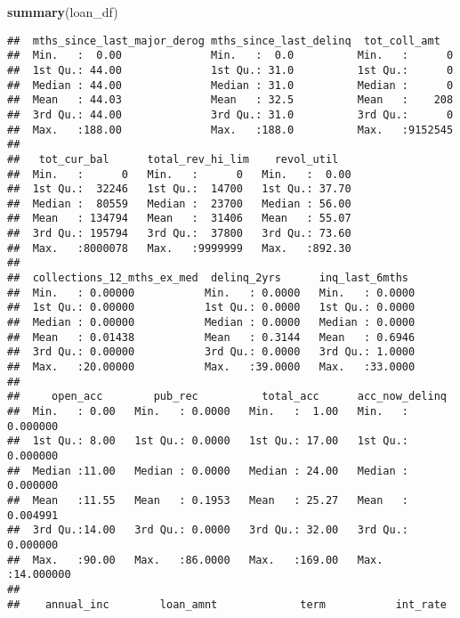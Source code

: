 \documentclass[]{article}
\newenvironment{Shaded}{\begin{snugshade}}{\end{snugshade}}
\newcommand{\KeywordTok}[1]{\textcolor[rgb]{0.13,0.29,0.53}{\textbf{#1}}}
\newcommand{\NormalTok}[1]{#1}
\begin{document}
\begin{Shaded}
\begin{Highlighting}[]
\KeywordTok{summary}\NormalTok{(loan_df)}
\end{Highlighting}
\end{Shaded}

\begin{verbatim}
##  mths_since_last_major_derog mths_since_last_delinq  tot_coll_amt    
##  Min.   :  0.00              Min.   :  0.0          Min.   :      0  
##  1st Qu.: 44.00              1st Qu.: 31.0          1st Qu.:      0  
##  Median : 44.00              Median : 31.0          Median :      0  
##  Mean   : 44.03              Mean   : 32.5          Mean   :    208  
##  3rd Qu.: 44.00              3rd Qu.: 31.0          3rd Qu.:      0  
##  Max.   :188.00              Max.   :188.0          Max.   :9152545  
##                                                                      
##   tot_cur_bal      total_rev_hi_lim    revol_util    
##  Min.   :      0   Min.   :      0   Min.   :  0.00  
##  1st Qu.:  32246   1st Qu.:  14700   1st Qu.: 37.70  
##  Median :  80559   Median :  23700   Median : 56.00  
##  Mean   : 134794   Mean   :  31406   Mean   : 55.07  
##  3rd Qu.: 195794   3rd Qu.:  37800   3rd Qu.: 73.60  
##  Max.   :8000078   Max.   :9999999   Max.   :892.30  
##                                                      
##  collections_12_mths_ex_med  delinq_2yrs      inq_last_6mths   
##  Min.   : 0.00000           Min.   : 0.0000   Min.   : 0.0000  
##  1st Qu.: 0.00000           1st Qu.: 0.0000   1st Qu.: 0.0000  
##  Median : 0.00000           Median : 0.0000   Median : 0.0000  
##  Mean   : 0.01438           Mean   : 0.3144   Mean   : 0.6946  
##  3rd Qu.: 0.00000           3rd Qu.: 0.0000   3rd Qu.: 1.0000  
##  Max.   :20.00000           Max.   :39.0000   Max.   :33.0000  
##                                                                
##     open_acc        pub_rec          total_acc      acc_now_delinq     
##  Min.   : 0.00   Min.   : 0.0000   Min.   :  1.00   Min.   : 0.000000  
##  1st Qu.: 8.00   1st Qu.: 0.0000   1st Qu.: 17.00   1st Qu.: 0.000000  
##  Median :11.00   Median : 0.0000   Median : 24.00   Median : 0.000000  
##  Mean   :11.55   Mean   : 0.1953   Mean   : 25.27   Mean   : 0.004991  
##  3rd Qu.:14.00   3rd Qu.: 0.0000   3rd Qu.: 32.00   3rd Qu.: 0.000000  
##  Max.   :90.00   Max.   :86.0000   Max.   :169.00   Max.   :14.000000  
##                                                                        
##    annual_inc        loan_amnt             term           int_rate    

\end{verbatim}
\end{document}
